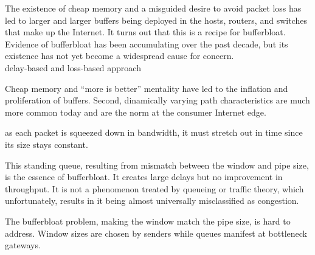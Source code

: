 The existence of cheap memory and a misguided desire to avoid packet loss has led to larger and larger buffers being deployed in the hosts, routers, and switches that make up the Internet. It turns out that this is a recipe for bufferbloat. Evidence of bufferbloat has been accumulating over the past decade, but its existence has not yet become a widespread cause for concern.\\


delay-based and loss-based approach

\cite{NicholsJacobsonCQD}
Cheap memory and ``more is better'' mentality have led to the inflation and proliferation of buffers. Second, dinamically varying path characteristics are much more common today and are the norm at the consumer Internet edge.

as each packet is squeezed down in bandwidth, it must stretch out in time since its size stays constant.

This standing queue, resulting from mismatch between the window and pipe size, is the essence of bufferbloat. It creates large delays but no improvement in throughput. It is not a phenomenon treated by queueing or traffic theory, which unfortunately, results in it being almost universally misclassified as congestion.

The bufferbloat problem, making the window match the pipe size, is hard to address. Window sizes are chosen by senders while queues manifest at bottleneck gateways.